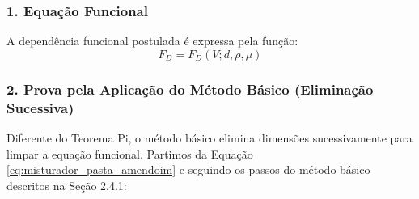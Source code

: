 \subsubsection*{1. Equação Funcional}
A dependência funcional postulada é expressa pela função:
\begin{equation*}
    F_D = F_D(V; d, \rho, \mu) \tag{2.7} 
    \label{eq:misturador_pasta_amendoim}
\end{equation*}

\vspace{0.5cm}

\subsubsection*{2. Prova pela Aplicação do Método Básico (Eliminação Sucessiva)}

Diferente do Teorema Pi, o método básico elimina dimensões sucessivamente para limpar a equação funcional.
Partimos da Equação \ref{eq:misturador_pasta_amendoim} e seguindo os passos do método básico descritos na Seção 2.4.1:

